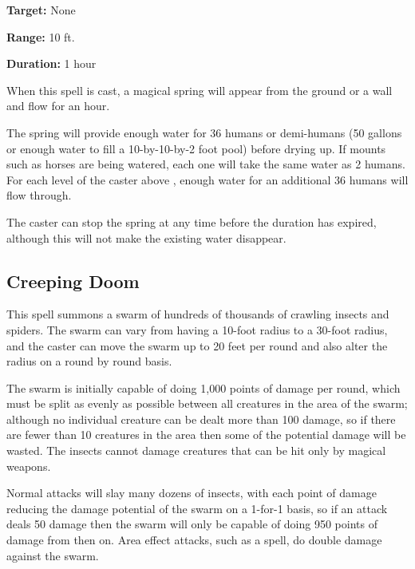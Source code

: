 \begin{multicols*}{2}
{\textbf{Target:} None

\textbf{Range:} 10 ft.

\textbf{Duration:} 1 hour}

When this spell is cast, a magical spring will appear from the ground or a wall and flow for an hour.

The spring will provide enough water for 36 humans or demi-humans (50 gallons or enough water to fill a 10-by-10-by-2 foot pool) before drying up. If mounts such as horses are being watered, each one will take the same water as 2 humans. For each level of the caster above , enough water for an additional 36 humans will flow through.

The caster can stop the spring at any time before the duration has expired, although this will not make the existing water disappear.

\subsection{Creeping Doom}\label{spell:Creeping Doom}

This spell summons a swarm of hundreds of thousands of crawling insects and spiders. The swarm can vary from having a 10-foot radius to a 30-foot radius, and the caster can move the swarm up to 20 feet per round and also alter the radius on a round by round basis.

The swarm is initially capable of doing 1,000 points of damage per round, which must be split as evenly as possible between all creatures in the area of the swarm; although no individual creature can be dealt more than 100 damage, so if there are fewer than 10 creatures in the area then some of the potential damage will be wasted. The insects cannot damage creatures that can be hit only by magical weapons.

Normal attacks will slay many dozens of insects, with each point of damage reducing the damage potential of the swarm on a 1-for-1 basis, so if an attack deals 50 damage then the swarm will only be capable of doing 950 points of damage from then on. Area effect attacks, such as a  spell, do double damage against the swarm.


\end{multicols*}
